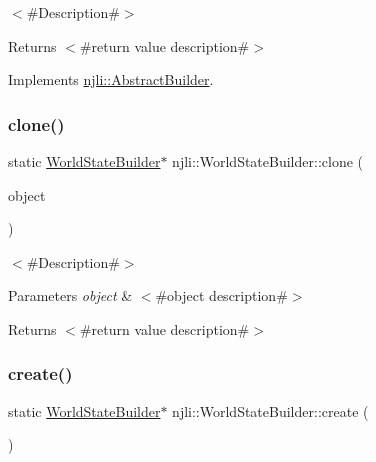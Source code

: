 $<$\#\+Description\#$>$

\begin{DoxyReturn}{Returns}
$<$\#return value description\#$>$ 
\end{DoxyReturn}


Implements \mbox{\hyperlink{classnjli_1_1_abstract_builder_aa1d220053e182c37b31b427499c6eacf}{njli\+::\+Abstract\+Builder}}.

\mbox{\label{classnjli_1_1_world_state_builder_aa5ab40b1e0b5fbb41fa8d418dac235a9}} 
\subsubsection{\texorpdfstring{clone()}{clone()}}
{\footnotesize\ttfamily static \mbox{\hyperlink{classnjli_1_1_world_state_builder}{World\+State\+Builder}}$\ast$ njli\+::\+World\+State\+Builder\+::clone (\begin{DoxyParamCaption}\item[{const \mbox{\hyperlink{classnjli_1_1_world_state_builder}{World\+State\+Builder}} \&}]{object }\end{DoxyParamCaption})\hspace{0.3cm}{\ttfamily [static]}}

$<$\#\+Description\#$>$


\begin{DoxyParams}{Parameters}
{\em object} & $<$\#object description\#$>$\\
\hline
\end{DoxyParams}
\begin{DoxyReturn}{Returns}
$<$\#return value description\#$>$ 
\end{DoxyReturn}
\mbox{\label{classnjli_1_1_world_state_builder_a171cf071f02204ca6a87eb6a417da4f9}} 
\subsubsection{\texorpdfstring{create()}{create()}}
{\footnotesize\ttfamily static \mbox{\hyperlink{classnjli_1_1_world_state_builder}{World\+State\+Builder}}$\ast$ njli\+::\+World\+State\+Builder\+::create (\begin{DoxyParamCaption}{ }\end{DoxyParamCaption})\hspace{0.3cm}{\ttfamily [static]}}

